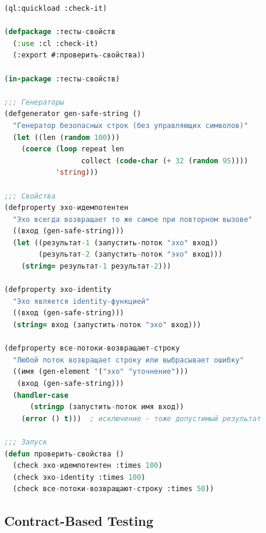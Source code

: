 \documentclass[12pt, a4paper, twoside]{article}
\begin{document}
\begin{lstlisting}[language=CommonLisp,caption={Property-based тесты}]
(ql:quickload :check-it)

(defpackage :тесты-свойств
  (:use :cl :check-it)
  (:export #:проверить-свойства))

(in-package :тесты-свойств)

;;; Генераторы
(defgenerator gen-safe-string ()
  "Генератор безопасных строк (без управляющих символов)"
  (let ((len (random 100)))
    (coerce (loop repeat len
                  collect (code-char (+ 32 (random 95))))
            'string)))

;;; Свойства
(defproperty эхо-идемпотентен
  "Эхо всегда возвращает то же самое при повторном вызове"
  ((вход (gen-safe-string)))
  (let ((результат-1 (запустить-поток "эхо" вход))
        (результат-2 (запустить-поток "эхо" вход)))
    (string= результат-1 результат-2)))

(defproperty эхо-identity
  "Эхо является identity-функцией"
  ((вход (gen-safe-string)))
  (string= вход (запустить-поток "эхо" вход)))

(defproperty все-потоки-возвращают-строку
  "Любой поток возвращает строку или выбрасывает ошибку"
  ((имя (gen-element '("эхо" "уточнение")))
   (вход (gen-safe-string)))
  (handler-case
      (stringp (запустить-поток имя вход))
    (error () t)))  ; исключение - тоже допустимый результат

;;; Запуск
(defun проверить-свойства ()
  (check эхо-идемпотентен :times 100)
  (check эхо-identity :times 100)
  (check все-потоки-возвращают-строку :times 50))
\end{lstlisting}

\subsection{Contract-Based Testing}
\end{document}
